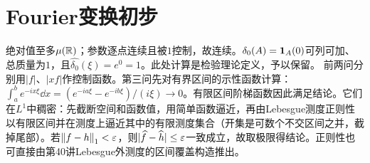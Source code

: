 \documentclass[UTF8,fontset=fandol,11pt]{ctexart}
\begin{document}
\section{Fourier变换初步}
绝对值至多$\mu(\mathbb R)$；参数逐点连续且被$1$控制，故连续。$\delta_0(A)=\mathbf1_A(0)$可列可加、总质量为$1$，且$\widehat{\delta_0}(\xi)=e^0=1$。此处计算是检验理论定义，予以保留。
前两问分别用$|f|$、$|xf|$作控制函数。第三问先对有界区间的示性函数计算：$\int_a^be^{-ix\xi}\dd x=(e^{-ia\xi}-e^{-ib\xi})/(i\xi)\to0$。有限区间阶梯函数因此满足结论。它们在$L^1$中稠密：先截断空间和函数值，用简单函数逼近，再由Lebesgue测度正则性以有限区间并在测度上逼近其中的有限测度集合（开集是可数个不交区间之并，截掉尾部）。若$\left\lVert f-h\right\rVert_1<\varepsilon$，则$|\widehat f-\widehat h|\le\varepsilon$一致成立，故取极限得结论。正则性也可直接由第40讲Lebesgue外测度的区间覆盖构造推出。
\end{document}
